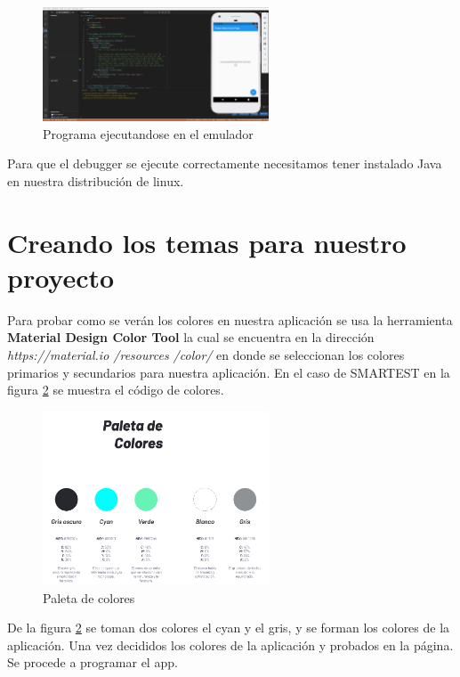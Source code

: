\begin{figure}[htb]
\centering
\includegraphics[width=0.6\textwidth]{capitulo1/emulador_corriendo.png}
\caption{Programa ejecutandose en el emulador}
\label{cap1:002}
\end{figure} 

Para que el debugger se ejecute correctamente necesitamos tener instalado Java en nuestra distribución de linux.

\section{Creando los temas para nuestro proyecto}

Para probar como se verán los colores en nuestra aplicación se usa la herramienta \textbf{Material Design Color Tool} la cual se encuentra en la dirección \emph{https://material.io /resources /color/ } en donde se seleccionan los colores primarios y secundarios para nuestra aplicación. En el caso de SMARTEST en la figura \ref{cap1:003} se muestra el código de colores.

\begin{figure}[htb]
\centering
\includegraphics[width=0.6\textwidth]{capitulo1/paleta.png}
\caption{Paleta de colores}
\label{cap1:003}
\end{figure} 

De la figura \ref{cap1:003} se toman dos colores el cyan y el gris, y se forman los colores de la aplicación. Una vez decididos los colores de la aplicación y probados en la página. Se procede a programar el app.

